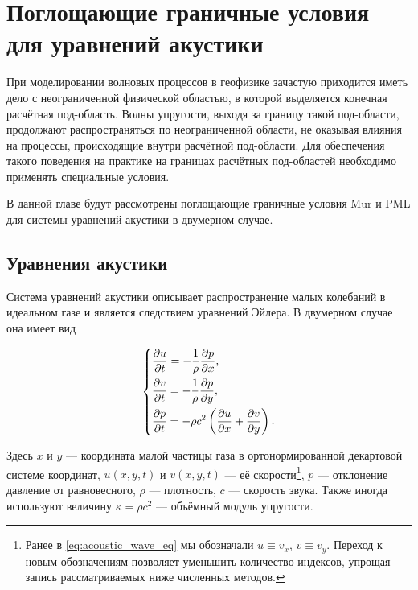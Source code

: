 \section{Поглощающие граничные условия для уравнений акустики} \label{sec:absorbing}

При моделировании волновых процессов в геофизике зачастую приходится иметь дело с неограниченной физической областью, в которой выделяется конечная расчётная под-область. Волны упругости, выходя за границу такой под-области, продолжают распространяться по неограниченной области, не оказывая влияния на процессы, происходящие внутри расчётной под-области. Для обеспечения такого поведения на практике на границах расчётных под-областей необходимо применять специальные условия.

В данной главе будут рассмотрены поглощающие граничные условия Mur и PML для системы уравнений акустики в двумерном случае.

\subsection{Уравнения акустики}

Система уравнений акустики описывает распространение малых колебаний в идеальном газе и является следствием уравнений Эйлера. В двумерном случае она имеет вид

\begin{equation}
\begin{dcases}
	\frac{\partial u}{\partial t} = -\frac{1}{\rho}\frac{\partial p}{\partial x} , \\
	\frac{\partial v}{\partial t} = -\frac{1}{\rho}\frac{\partial p}{\partial y} , \\
    \frac{\partial p}{\partial t} = -\rho c^2 \left(\frac{\partial u}{\partial x} + \frac{\partial v}{\partial y}\right) . \\
\end{dcases}
\label{eq:acoustic}
\end{equation}

\noindent Здесь $x$ и $y$ --- координата малой частицы газа в ортонормированной декартовой системе координат, $u(x,y,t)$ и $v(x,y,t)$ --- её скорости\footnote{Ранее в \eqref{eq:acoustic_wave_eq} мы обозначали $u\equiv v_x$, $v\equiv v_y$. Переход к новым обозначениям позволяет уменьшить количество индексов, упрощая запись рассматриваемых ниже численных методов.}, $p$ --- отклонение давление от равновесного, $\rho$ --- плотность, $c$ --- скорость звука. Также иногда используют величину $\kappa = \rho c^2$ --- объёмный модуль упругости.

